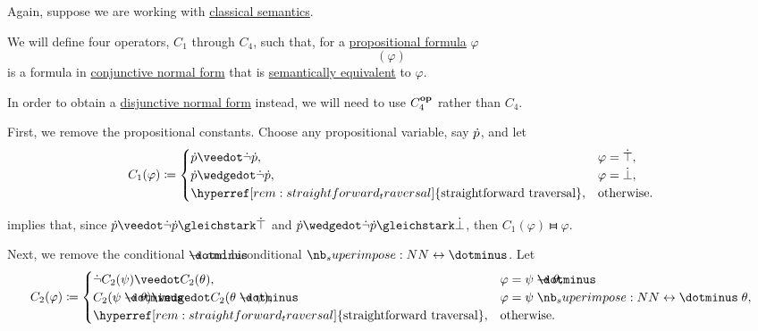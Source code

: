 \begin{algorithm}\label{alg:cnf_and_dnf}
  Again, suppose we are working with \hyperref[def:propositional_semantics]{classical semantics}.

  We will define four operators, \( C_1 \) through \( C_4 \), such that, for a \hyperref[def:propositional_syntax/formula]{propositional formula} \( \varphi \)
  \begin{equation*}
    [C_4 \bincirc C_3 \bincirc C_2 \bincirc C_1](\varphi)
  \end{equation*}
  is a formula in \hyperref[def:cnf_and_dnf]{conjunctive normal form} that is \hyperref[def:semantic_equivalence]{semantically equivalent} to \( \varphi \).

  In order to obtain a \hyperref[def:cnf_and_dnf]{disjunctive normal form} instead, we will need to use \( C_4^\oppos \) rather than \( C_4 \).

  \begin{thmenum}
     First, we remove the propositional constants. Choose any propositional variable, say \( \dot{p} \), and let
    \begin{equation*}
      C_1(\varphi) \coloneqq \begin{cases}
        \syn p \synvee \synneg \syn p,                                           &\varphi = \syntop, \\
        \syn p \synwedge \synneg \syn p,                                         &\varphi = \synbot, \\
        \hyperref[rem:straightforward_traversal]{\T{straightforward traversal}}, &\T{otherwise.}
      \end{cases}
    \end{equation*}

     implies that, since \( \syn p \synvee \synneg \syn p \gleichstark \syntop \) and \( \syn p \synwedge \synneg \syn p \gleichstark \synbot \), then \( C_1(\varphi) \gleichstark \varphi \).

     Next, we remove the conditional \( \synimplies \) and biconditional \( \syniff \). Let
    \begin{equation*}
      C_2(\varphi) \coloneqq \begin{cases}
        \synneg C_2(\psi) \synvee C_2(\theta),                                   &\varphi = \psi \synimplies \theta, \\
        C_2(\psi \synimplies \theta) \synwedge C_2(\theta \synimplies \psi),     &\varphi = \psi \syniff \theta, \\
        \hyperref[rem:straightforward_traversal]{\T{straightforward traversal}}, &\T{otherwise.}
      \end{cases}
    \end{equation*}


\end{thmenum}
\end{algorithm}
